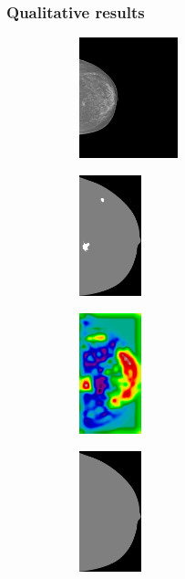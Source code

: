 \documentclass{beamer}
\begin{document}
	\begin{frame}
		\frametitle{Qualitative results}
		\begin{figure}[h]
		\centering
			\begin{subfigure}{0.25\textwidth}
				\centering
					\includegraphics[height=3.5cm]{plots/mammogram_ex1.png}
			\end{subfigure}
			\begin{subfigure}{0.16\textwidth}
				\centering
					\includegraphics[height=3.5cm]{plots/label_ex1.png}
			\end{subfigure}
			\begin{subfigure}{0.17\textwidth}
				\centering
					\includegraphics[height=3.5cm]{plots/logits_ex1_v2.png}
			\end{subfigure}
			\begin{subfigure}{0.22\textwidth}
				\centering
					\includegraphics[height=3.5cm]{plots/segmentation_ex1_v2.png}
			\end{subfigure}%
			\\
			\begin{subfigure}{0.25\textwidth}

\end{subfigure}
\end{figure}
\end{frame}
\end{document}
